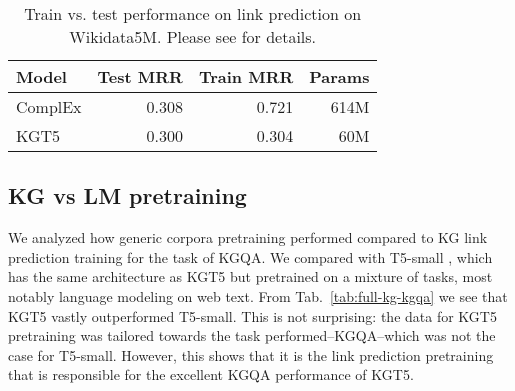 \documentclass[11pt]{article}
\renewcommand\:{\colon} \newcommand{\sset}[1]{\left\{\,#1\,\right\}} \newcommand{\ssets}[1]{\left\{#1\right\}} \newcommand{\ssetn}[1]{\{\,#1\,\}}
\newcommand{\method}{\textsc{KGT5}}
\begin{document}
\begin{table}[t!]
\centering
{}
\caption{Hits@1 in the full-KG KGQA setting. For details please see .}
\label{tab:full-kg-kgqa}
\end{table} \begin{table}[t!]
\centering
\begin{tabular}{@{}lrrr@{}}
\toprule
\textbf{Model} & \multicolumn{1}{c}{\textbf{Test MRR}} & \multicolumn{1}{c}{\textbf{Train MRR}} & \multicolumn{1}{l}{\textbf{Params}} \\ \midrule
ComplEx        & 0.308                                 & 0.721                                  & 614M                                \\
KGT5           & 0.300                                 & 0.304                                  & 60M                                 \\ \bottomrule
\end{tabular}

\caption{Train vs. test performance on link prediction on Wikidata5M. Please see  for details.}
\label{tab:train-test-mrr}
\end{table} 
\subsection{KG vs LM pretraining}
\label{sec:kg_vs_lm_pretraining}
We analyzed how generic corpora pretraining performed compared to KG link prediction training for the task of KGQA. We compared with T5-small
\cite{raffel2020exploring}, which has the same architecture as \method{} but pretrained on a mixture of tasks, most notably language modeling on
web text. 
From Tab.~\ref{tab:full-kg-kgqa} we see that \method{} vastly outperformed T5-small. This is not surprising: the data for \method{} pretraining was tailored towards the task performed--KGQA--which was not the case for T5-small. However, this shows that it is the link prediction pretraining that is responsible for the excellent KGQA performance of \method{}.
\end{document}

